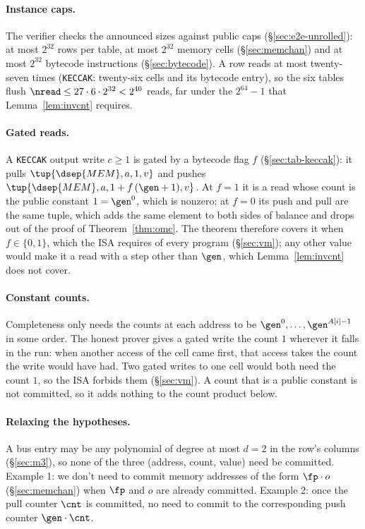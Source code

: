 \paragraph{Instance caps.} The verifier checks the announced sizes against public caps (\S\ref{sec:e2e-unrolled}): at most $2^{32}$ rows per table, at most $2^{32}$ memory cells (\S\ref{sec:memchan}) and at most $2^{32}$ bytecode instructions (\S\ref{sec:bytecode}). A row reads at most twenty-seven times (\texttt{KECCAK}: twenty-six cells and its bytecode entry), so the six tables flush $\nread\le27\cdot6\cdot2^{32}<2^{40}$ reads, far under the $2^{64}-1$ that Lemma~\ref{lem:invcnt} requires.

\paragraph{Gated reads.} A \texttt{KECCAK} output write $c\ge1$ is gated by a bytecode flag $f$ (\S\ref{sec:tab-keccak}): it pulls $\tup{\dsep{MEM},a,1,v}$ and pushes $\tup{\dsep{MEM},a,1+f\,(\gen+1),v}$. At $f=1$ it is a read whose count is the public constant $1=\gen^{0}$, which is nonzero; at $f=0$ its push and pull are the same tuple, which adds the same element to both sides of balance and drops out of the proof of Theorem~\ref{thm:omc}. The theorem therefore covers it when $f\in\{0,1\}$, which the ISA requires of every program (\S\ref{sec:vm}); any other value would make it a read with a step other than $\gen$, which Lemma~\ref{lem:invcnt} does not cover.

\paragraph{Constant counts.} Completeness only needs the counts at each address to be $\gen^{0},\dots,\gen^{A[i]-1}$ in some order. The honest prover gives a gated write the count $1$ wherever it falls in the run: when another access of the cell came first, that access takes the count the write would have had. Two gated writes to one cell would both need the count $1$, so the ISA forbids them (\S\ref{sec:vm}). A count that is a public constant is not committed, so it adds nothing to the count product below.

\paragraph{Relaxing the hypotheses.} A bus entry may be any polynomial of degree at most $d = 2$ in the row's columns (\S\ref{sec:m3}), so none of the three (address, count, value) need be committed. Example 1: we don't need to commit memory addresses of the form $\fp\cdot o$ (\S\ref{sec:memchan}) when $\fp$ and $o$ are already committed. Example 2: once the pull counter $\cnt$ is committed, no need to commit to the corresponding push counter $\gen\cdot\cnt$.

